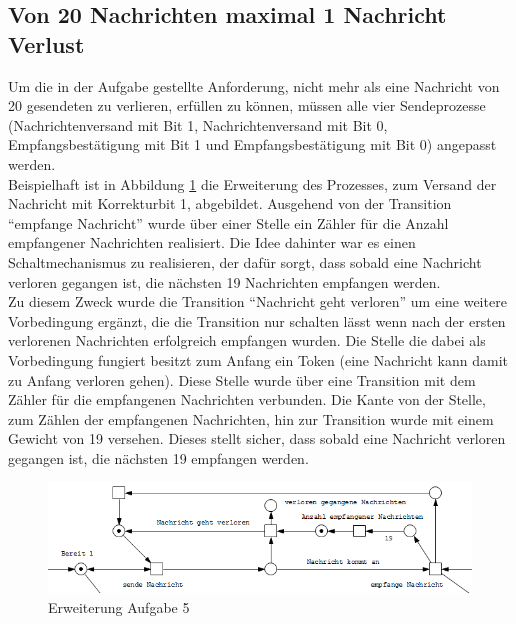 \documentclass[10pt]{scrartcl}
\begin{document}
\subsection{Von 20 Nachrichten maximal 1 Nachricht Verlust}
\label{sec:nachrichtenverlust_1}
Um die in der Aufgabe gestellte Anforderung, nicht mehr als eine Nachricht von 20 gesendeten zu verlieren, erfüllen zu können, müssen alle vier Sendeprozesse (Nachrichtenversand mit Bit 1, Nachrichtenversand mit Bit 0, Empfangsbestätigung mit Bit 1 und Empfangsbestätigung mit Bit 0) angepasst werden.\\
Beispielhaft ist in Abbildung \ref{fig:Erweiterung5} die Erweiterung des Prozesses, zum Versand der Nachricht mit Korrekturbit 1, abgebildet.
Ausgehend von der Transition "`empfange Nachricht"' wurde über einer Stelle ein Zähler für die Anzahl empfangener Nachrichten realisiert. 
Die Idee dahinter war es einen Schaltmechanismus zu realisieren, der dafür sorgt, dass sobald eine Nachricht verloren gegangen ist, die nächsten 19 Nachrichten empfangen werden.\\
Zu diesem Zweck wurde die Transition "`Nachricht geht verloren"' um eine weitere Vorbedingung ergänzt, die die Transition nur schalten lässt wenn nach der ersten verlorenen Nachrichten erfolgreich empfangen wurden. Die Stelle die dabei als Vorbedingung fungiert besitzt zum Anfang ein Token (eine Nachricht kann damit zu Anfang verloren gehen).
Diese Stelle wurde über eine Transition mit dem Zähler für die empfangenen Nachrichten verbunden.
Die Kante von der Stelle, zum Zählen der empfangenen Nachrichten, hin zur Transition wurde mit einem Gewicht von 19 versehen.
Dieses stellt sicher, dass sobald eine Nachricht verloren gegangen ist, die nächsten 19 empfangen werden.  

\begin{figure}[htbp]
	\centering	\includegraphics[width=1.0\textwidth]{Bilder/Erweiterung_Aufgabe_5}
	\caption{Erweiterung Aufgabe 5}
	\label{fig:Erweiterung5}
\end{figure}
\end{document}
